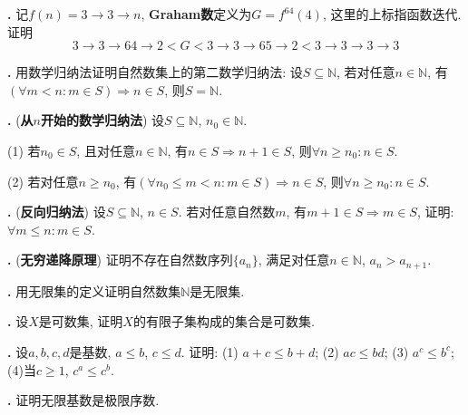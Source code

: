 \par \textbf{\theprobset .} \cite{BN} 记$f(n)=3\rightarrow 3\rightarrow n$, \textbf{Graham数}定义为$G=f^{64}(4)$, 这里的上标指函数迭代. 证明
\begin{equation}
    3\rightarrow 3\rightarrow 64\rightarrow 2 < G < 3\rightarrow 3\rightarrow 65\rightarrow 2 < 3\rightarrow 3\rightarrow 3\rightarrow 3
\end{equation}

\par \textbf{\theprobset .} 用数学归纳法证明自然数集上的第二数学归纳法: 设$S\subseteq \mathbb{N}$, 若对任意$n\in \mathbb{N}$, 有$(\forall m<n: m\in S)\Rightarrow n\in S$, 则$S=\mathbb{N}$. 

\par \textbf{\theprobset .} (\textbf{从$n$开始的数学归纳法}) 设$S\subseteq \mathbb{N}$, $n_0\in \mathbb{N}$.
\par (1) 若$n_0\in S$, 且对任意$n\in \mathbb{N}$, 有$n\in S\Rightarrow n+1\in S$, 则$\forall n\ge n_0: n\in S$. 
\par (2) 若对任意$n\ge n_0$, 有$(\forall n_0\le m<n: m\in S)\Rightarrow n\in S$, 则$\forall n\ge n_0: n\in S$. 

\par \textbf{\theprobset .} (\textbf{反向归纳法}) 设$S\subseteq \mathbb{N}$, $n\in S$. 若对任意自然数$m$, 有$m+1\in S \Rightarrow m\in S$, 证明: $\forall m\le n: m\in S$. 

\par \textbf{\theprobset .} (\textbf{无穷递降原理}) 证明不存在自然数序列$\{a_n\}$, 满足对任意$n\in \mathbb{N}$, $a_n>a_{n+1}$.

\par \textbf{\theprobset .} \cite{NST} 用无限集的定义证明自然数集$\mathbb{N}$是无限集. 

\par \textbf{\theprobset .} \cite{NST} 设$X$是可数集, 证明$X$的有限子集构成的集合是可数集.

\par \textbf{\theprobset .} \cite{NST} 设$a,b,c,d$是基数, $a\le b$, $c\le d$. 证明: (1) $a+c\le b+d$; (2) $ac\le bd$; (3) $a^c\le b^c$; (4)当$c\ge 1$, $c^a\le c^b$. 

\par \textbf{\theprobset .} \cite{NST} 证明无限基数是极限序数. 

